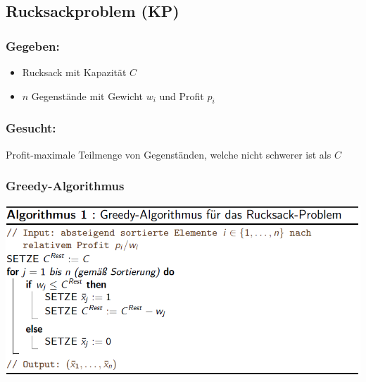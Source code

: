 \documentclass[12pt]{article}
\begin{document}
		\subsection{Rucksackproblem (KP)}
			\subsubsection*{Gegeben:}
			\begin{itemize}
				\item Rucksack mit Kapazität $C$
				\item $n$ Gegenstände mit Gewicht $w_i$ und Profit $p_i$
			\end{itemize}
			
			\subsubsection*{Gesucht:}
			Profit-maximale Teilmenge von Gegenständen, welche nicht schwerer ist als $C$
			
			\subsubsection*{Greedy-Algorithmus}\label{KPGreedy}
			\includegraphics[scale=0.6]{KPGreedy}
\end{document}
